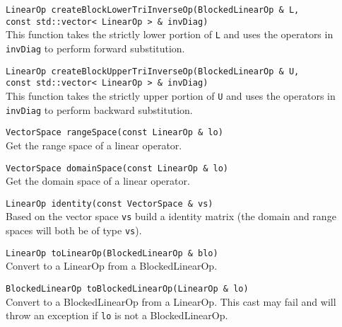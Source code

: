\documentclass[12pt]{article}
\newcommand{\code}[1]{\lstinline[basicstyle=\footnotesize]!#1!}
\newcommand{\scode}[1]{\lstinline[basicstyle=\small\bfseries]!#1!}
\begin{document}
\begin{framed}
\begin{flushleft}
\scode{LinearOp createBlockLowerTriInverseOp(BlockedLinearOp & L,}\\
\hspace{167pt}\scode{const std::vector< LinearOp > & invDiag)} \\
This function takes the strictly lower portion of \code{L} and uses the operators in
\code{invDiag} to perform forward substitution.

\vspace{10pt}
\scode{LinearOp createBlockUpperTriInverseOp(BlockedLinearOp & U,}\\
\hspace{167pt}\scode{const std::vector< LinearOp > & invDiag)} \\
This function takes the strictly upper portion of \code{U} and uses the operators in
\code{invDiag} to perform backward substitution.

\vspace{10pt}
\scode{VectorSpace rangeSpace(const LinearOp & lo)}\\
Get the range space of a linear operator.

\vspace{10pt}
\scode{VectorSpace domainSpace(const LinearOp & lo)}\\
Get the domain space of a linear operator. 

\vspace{10pt}
\scode{LinearOp identity(const VectorSpace & vs)}\\
Based on the vector space \code{vs} build a identity matrix (the domain and range
spaces will both be of type \code{vs}).

\vspace{10pt}
\scode{LinearOp toLinearOp(BlockedLinearOp & blo)}\\
Convert to a LinearOp from a BlockedLinearOp.

\vspace{10pt}
\scode{BlockedLinearOp toBlockedLinearOp(LinearOp & lo)}\\
Convert to a BlockedLinearOp from a LinearOp. This cast
may fail and will throw an exception if \code{lo} is not a
BlockedLinearOp.

\end{flushleft}
\end{framed}



\end{document}
